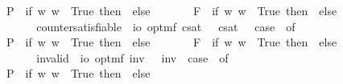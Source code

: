 \begin{isabellebody}
\ \ \ \ P{\isacharparenleft}{\isasympsi}{\isacharparenright}\ {\isasymRightarrow}\ if\ {\isasymexists}w{\isachardot}{\isacharparenleft}{\isasympsi}\ w{\isacharparenright}\ {\isasymlongleftrightarrow}\ True\ then\ {\isasymtop}\ else\ {\isasymbottom}\ {\isacharbar}\ \isanewline
\ \ \ \ F{\isacharparenleft}{\isasympsi}{\isacharparenright}\ {\isasymRightarrow}\ if\ {\isasymexists}w{\isachardot}{\isacharparenleft}{\isasympsi}\ w{\isacharparenright}\ {\isasymlongleftrightarrow}\ True\ then\ {\isasymtop}\ else\ {\isasymbottom}\ {\isacharbar}\ \isanewline
\ \ \ \ {\isacharunderscore}\ {\isasymRightarrow}\ {\isacharasterisk}{\isachardoublequoteclose}\isanewline
\ \isamarkupfalse%
\ countersatisfiable\ {\isacharcolon}{\isacharcolon}\ {\isachardoublequoteopen}io\ opt{\isasymRightarrow}mf{\isachardoublequoteclose}\ {\isacharparenleft}{\isachardoublequoteopen}{\isacharbrackleft}{\isacharunderscore}{\isacharbrackright}\isactrlsup c\isactrlsup s\isactrlsup a\isactrlsup t{\isachardoublequoteclose}\ {\isacharbrackleft}{}{\isacharbrackright}{\isacharparenright}\ \ {\isachardoublequoteopen}{\isacharbrackleft}{\isasymphi}{\isacharbrackright}\isactrlsup c\isactrlsup s\isactrlsup a\isactrlsup t\ {\isasymequiv}\ \ case\ {\isasymphi}\ of\ \isanewline
\ \ \ \ P{\isacharparenleft}{\isasympsi}{\isacharparenright}\ {\isasymRightarrow}\ if\ {\isasymexists}w{\isachardot}{\isasymnot}{\isacharparenleft}{\isasympsi}\ w{\isacharparenright}\ {\isasymlongleftrightarrow}\ True\ then\ {\isasymtop}\ else\ {\isasymbottom}\ {\isacharbar}\ \isanewline
\ \ \ \ F{\isacharparenleft}{\isasympsi}{\isacharparenright}\ {\isasymRightarrow}\ if\ {\isasymexists}w{\isachardot}{\isasymnot}{\isacharparenleft}{\isasympsi}\ w{\isacharparenright}\ {\isasymlongleftrightarrow}\ True\ then\ {\isasymtop}\ else\ {\isasymbottom}\ {\isacharbar}\ \isanewline
\ \ \ \ {\isacharunderscore}\ {\isasymRightarrow}\ {\isacharasterisk}{\isachardoublequoteclose}\isanewline
\ \isamarkupfalse%
\ invalid\ {\isacharcolon}{\isacharcolon}\ {\isachardoublequoteopen}io\ opt{\isasymRightarrow}mf{\isachardoublequoteclose}\ {\isacharparenleft}{\isachardoublequoteopen}{\isacharbrackleft}{\isacharunderscore}{\isacharbrackright}\isactrlsup i\isactrlsup n\isactrlsup v{\isachardoublequoteclose}\ {\isacharbrackleft}{}{\isacharbrackright}{\isacharparenright}\ \ {\isachardoublequoteopen}{\isacharbrackleft}{\isasymphi}{\isacharbrackright}\isactrlsup i\isactrlsup n\isactrlsup v\ {\isasymequiv}\ case\ {\isasymphi}\ of\ \isanewline
\ \ \ \ P{\isacharparenleft}{\isasympsi}{\isacharparenright}\ {\isasymRightarrow}\ if\ {\isasymforall}w{\isachardot}{\isasymnot}{\isacharparenleft}{\isasympsi}\ w{\isacharparenright}\ {\isasymlongleftrightarrow}\ True\ then\ {\isasymtop}\ else\ {\isasymbottom}\ {\isacharbar}\ \isanewline

\end{isabellebody}
